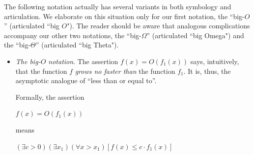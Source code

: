 \smallskip

The following notation actually has several variants in both symbology and articulation.  We elaborate on this situation only for our first notation, the ``big-$O$'' (articulated ``big $O$").  The reader should be aware that analogous complications accompany our other two notations, the ``big-$\Omega$'' (articulated ``big Omega") and the ``big-$\Theta$'' (articulated ``big Theta"). 
 
\begin{itemize}
\item
{\em The big-$O$ notation}.
The assertion $f(x) = O(f_1(x))$ says, intuitively, that the function $f$ {\em grows no faster than} the function $f_1$.  It is, thus, the asymptotic analogue of ``less than or equal to''.

\smallskip

Formally, the assertion

\hspace*{.2in}$f(x) = O(f_1(x))$

means

\hspace*{.2in}
$(\exists c >0)(\exists x_1)(\forall x > x_1)
[f(x) \leq c \cdot f_1(x)]$

\bigskip


\noindent {}
\end{itemize}
